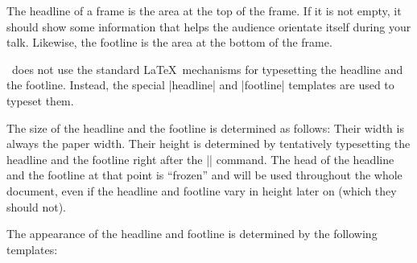 The headline of a frame is the area at the top of the frame. If it is
not empty, it should show some information that helps the audience
orientate itself during your talk. Likewise, the footline is the area
at the bottom of the frame.

\beamer\ does not use the standard \LaTeX\ mechanisms for typesetting
the headline and the footline. Instead, the special |headline| and
|footline| templates are used to typeset them.

The size of the headline and the footline is determined as follows:
Their width is always the paper width. Their height is determined by
tentatively typesetting the headline and the footline right after the
|| command. The head of the headline and the footline
at that point is ``frozen'' and will be used throughout the whole
document, even if the headline and footline vary in height later on
(which they should not).

The appearance of the headline and footline is determined by the
following templates:

